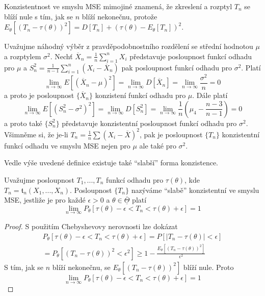 Konzistentnost ve smyslu MSE mimojiné znamená, že zkreslení a rozptyl $T_n$ se blíží nule s tím, jak se $n$ blíží nekonečnu, protože $E_{\theta}[(T_n - \tau(\theta))^2] = D[T_n] + (\tau(\theta) - E_{\theta}[T_n])^2$.

\begin{example}
Uvažujme náhodný výběr z pravděpodobnostního rozdělení se střední hodnotou $\mu$ a rozptylem $\sigma^2$. Nechť $\overline{X}_n = \frac{1}{n}\sum_{i = 1}^n X_i$ představuje posloupnost funkcí odhadu pro $\mu$ a $S_n^2 = \frac{1}{n - 1} \sum_{i = 1}^n (X_i - \overline{X}_n)$ pak posloupnost funkcí odhadu pro $\sigma^2$. Platí
\begin{equation*}
\lim_{n \rightarrow \infty} E[(\overline{X}_n - \mu)^2] = \lim_{n \rightarrow \infty} D[\overline{X}_n] = \lim_{n \rightarrow \infty} \frac{\sigma^2}{n} = 0
\end{equation*}
a proto je posloupnost $\{\overline{X}_n\}$ konzistení funkcí odhadu pro $\mu$. Dále platí
\begin{equation*}
\lim_{n \rightarrow \infty} E[(S_n^2 - \sigma^2)^2] = \lim_{n \rightarrow \infty} D[S_n^2] = \lim_{n \rightarrow \infty} \frac{1}{n} \left(\mu_4 - \frac{n - 3}{n - 1} \right) = 0
\end{equation*}
a proto také $\{S_n^2\}$ představuje konzistentní posloupnost funkcí odhadu pro $\sigma^2$. Všimněme si, že je-li $T_n = \frac{1}{n} \sum (X_i - \overline{X})^2$, pak je posloupnost $\{T_n\}$ konzistentní funkcí odhadu ve smyslu MSE nejen pro $\mu$ ale také pro $\sigma^2$.
\end{example}

Vedle výše uvedené definice existuje také ``slabší'' forma konzistence.

\begin{definition}
Uvažujme posloupnost $T_1, ..., T_n$ funkcí odhadu pro $\tau(\theta)$, kde $T_n = \mathfrak{t}_n(X_1, ..., X_n)$. Posloupnost $\{T_n\}$ nazýváme ``slabě''  konzistentní ve smyslu MSE, jestliže je pro každé $\epsilon > 0$ a $\theta \in \overline{\underline{\Theta}}$ platí
\begin{equation*}
\lim_{n \rightarrow \infty} P_{\theta}[\tau(\theta) - \epsilon < T_n < \tau(\theta) + \epsilon] = 1
\end{equation*}
\end{definition}

\begin{proof}
S použitím Chebyshevovy nerovnosti lze dokázat
\begin{gather*}
P_{\theta}[\tau(\theta) - \epsilon < T_n < \tau(\theta) + \epsilon] = P[|T_n - \tau(\theta)| < \epsilon]\\
= P_{\theta}[(T_n - \tau(\theta))^2 < \epsilon^2] \ge 1 - \frac{E_{\theta}[(T_n - \tau(\theta))^2]}{\epsilon^2}
\end{gather*}
S tím, jak se $n$ blíží nekonečnu, se $E_{\theta}[(T_n - \tau(\theta))^2]$ blíží nule. Proto
\begin{equation*}
\lim_{n \rightarrow \infty} P_{\theta}[\tau(\theta) - \epsilon < T_n < \tau(\theta) + \epsilon] = 1
\end{equation*}
\end{proof}

